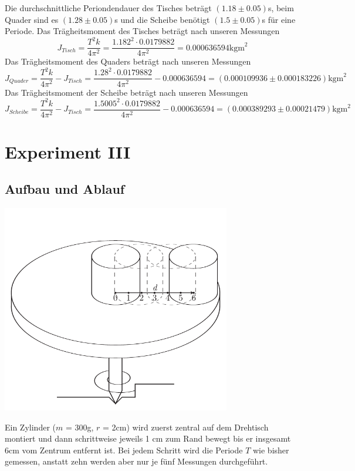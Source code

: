 \documentclass[12pt,a4paper]{article}
\begin{document}
Die durchschnittliche Periondendauer des Tisches betr\"agt $(1.18 \pm 0.05) $s, beim Quader sind es $(1.28 \pm 0.05)$s und die Scheibe ben\"otigt $(1.5 \pm 0.05)$s f\"ur eine Periode.
Das Tr\"agheitsmoment des Tisches betr\"agt nach unseren Messungen
\[ J_{Tisch} = \frac{T^2k}{4\pi^2} = \frac{1.182^2 \cdot 0.0179882}{4\pi^2} = 0.000636594 \mbox{kgm}^2\]
Das Tr\"agheitsmoment des Quaders betr\"agt nach unseren Messungen
\[ J_{Quader} = \frac{T^2k}{4\pi^2} - J_{Tisch} = \frac{1.28^2 \cdot 0.0179882}{4\pi^2} - 0.000636594 = (0.000109936 \pm 0.000183226) \mbox{kgm}^2 \]
Das Tr\"agheitsmoment der Scheibe betr\"agt nach unseren Messungen
\[ J_{Scheibe} = \frac{T^2k}{4\pi^2} - J_{Tisch} = \frac{1.5005^2 \cdot 0.0179882}{4\pi^2} - 0.000636594 = (0.000389293 \pm 0.00021479)  \mbox{kgm}^2 \]


\section*{Experiment III}
\subsection*{Aufbau und Ablauf}

\begin{center}
\includegraphics[width=10cm]{illustration3.pdf}
\end{center}
Ein Zylinder ($m$ = 300g, $r$ = 2cm) wird zuerst zentral auf dem Drehtisch montiert und dann schrittweise jeweils 1 cm zum Rand bewegt bis er insgesamt 6cm vom Zentrum entfernt ist. Bei jedem Schritt wird die Periode $T$ wie bisher gemessen, anstatt zehn werden aber nur je f\"unf Messungen durchgef\"uhrt.
\end{document}
